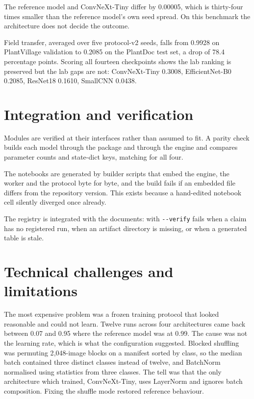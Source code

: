 The reference model and ConvNeXt-Tiny differ by 0.00005, which is thirty-four times
smaller than the reference model's own seed spread. On this benchmark the
architecture does not decide the outcome.

Field transfer, averaged over five protocol-v2 seeds, falls from 0.9928 on PlantVillage
validation to 0.2085 on the PlantDoc test set, a drop of 78.4 percentage points. Scoring all fourteen checkpoints
shows the lab ranking is preserved but the lab gaps are not: ConvNeXt-Tiny 0.3008,
EfficientNet-B0 0.2085, ResNet18 0.1610, SmallCNN 0.0438.

\section{Integration and verification}

Modules are verified at their interfaces rather than assumed to fit. A parity check
builds each model through the package and through the engine and compares parameter
counts and state-dict keys, matching for all four.

The notebooks are generated by builder scripts that embed the engine, the worker and
the protocol byte for byte, and the build fails if an embedded file differs from the
repository version. This exists because a hand-edited notebook cell silently diverged
once already.

The registry is integrated with the documents:  with \texttt{-{}-verify}
fails when a claim has no registered run, when an artifact directory is missing, or
when a generated table is stale.

\section{Technical challenges and limitations}

The most expensive problem was a frozen training protocol that looked reasonable and
could not learn. Twelve runs across four architectures came back between 0.07 and
0.95 where the reference model was at 0.99. The cause was not the learning rate,
which is what the configuration suggested. Blocked shuffling was permuting
2{,}048-image blocks on a manifest sorted by class, so the median batch contained
three distinct classes instead of twelve, and BatchNorm normalised using statistics
from three classes. The tell was that the only architecture which trained,
ConvNeXt-Tiny, uses LayerNorm and ignores batch composition. Fixing the shuffle mode
restored reference behaviour.

